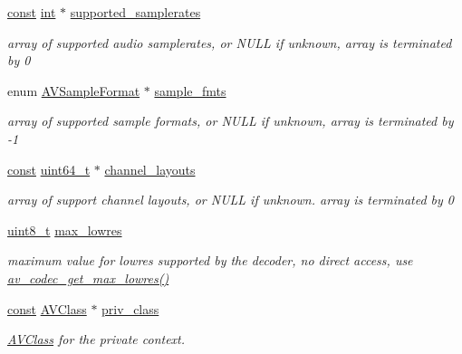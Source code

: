 \begin{DoxyCompactItemize}
\hyperlink{getopt1_8c_a2c212835823e3c54a8ab6d95c652660e}{const} \hyperlink{xmltok_8h_a5a0d4a5641ce434f1d23533f2b2e6653}{int} $\ast$ \hyperlink{struct_a_v_codec_aee7a194f1c3251958d3dabed3fa8148e}{supported\+\_\+samplerates}
\begin{DoxyCompactList}\small\item\em array of supported audio samplerates, or N\+U\+LL if unknown, array is terminated by 0 \end{DoxyCompactList}\item 
enum \hyperlink{samplefmt_8h_af9a51ca15301871723577c730b5865c5}{A\+V\+Sample\+Format} $\ast$ \hyperlink{struct_a_v_codec_aac19f4c45370f715412ad5c7b78daacf}{sample\+\_\+fmts}
\begin{DoxyCompactList}\small\item\em array of supported sample formats, or N\+U\+LL if unknown, array is terminated by -\/1 \end{DoxyCompactList}\item 
\hyperlink{getopt1_8c_a2c212835823e3c54a8ab6d95c652660e}{const} \hyperlink{lib-src_2ffmpeg_2win32_2stdint_8h_aec6fcb673ff035718c238c8c9d544c47}{uint64\+\_\+t} $\ast$ \hyperlink{struct_a_v_codec_a1d4c5152626bbd1f575a3e0014cb59e7}{channel\+\_\+layouts}
\begin{DoxyCompactList}\small\item\em array of support channel layouts, or N\+U\+LL if unknown. array is terminated by 0 \end{DoxyCompactList}\item 
\hyperlink{lib-src_2ffmpeg_2win32_2stdint_8h_a9a941819355e6f658991890ff66b4b0e}{uint8\+\_\+t} \hyperlink{struct_a_v_codec_afc51006d374ca72dfa3b0e29cbb1d981}{max\+\_\+lowres}
\begin{DoxyCompactList}\small\item\em maximum value for lowres supported by the decoder, no direct access, use \hyperlink{group__lavc__core_gafda0a87bc29a129cd12e858b4609cccd}{av\+\_\+codec\+\_\+get\+\_\+max\+\_\+lowres()} \end{DoxyCompactList}\item 
\hyperlink{getopt1_8c_a2c212835823e3c54a8ab6d95c652660e}{const} \hyperlink{struct_a_v_class}{A\+V\+Class} $\ast$ \hyperlink{struct_a_v_codec_a4ded9f7ec1fa1a73ea3e831428c100fa}{priv\+\_\+class}
\begin{DoxyCompactList}\small\item\em \hyperlink{struct_a_v_class}{A\+V\+Class} for the private context. \end{DoxyCompactList}\item 

\end{DoxyCompactItemize}
